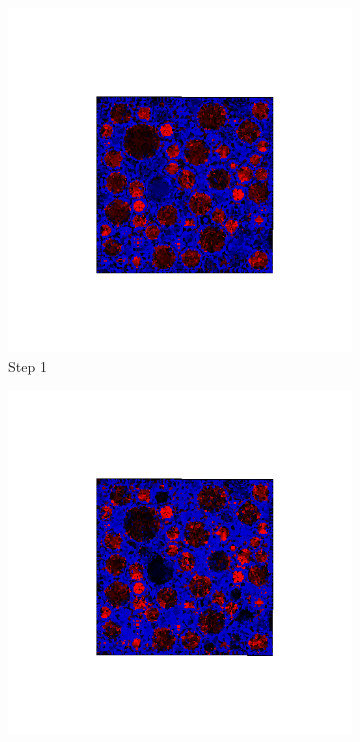   \begin{figure}[ht!]
  \centering
      \begin{subfigure}{.25\textwidth}
        \centering
        \includegraphics[width=1.0\linewidth]{Files//A30P75_3_IS/DEP50-STEP(001).png}
      \caption{Step 1}
      \end{subfigure}%
      \begin{subfigure}{.25\textwidth}
        \centering
        \includegraphics[width=1.0\linewidth]{Files/A30P75_3_IS/DEP50-STEP(002).png}

\end{subfigure}
\end{figure}
